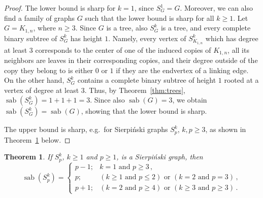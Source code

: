 \documentclass[10pt,a4paper]{amsart}
\newtheorem{theorem}{Theorem}[section]
\DeclareMathOperator{\sab}{\mathrm{sab}}
\begin{document}
\begin{proof}
The lower bound is sharp for $k=1$, since $S_G^1=G$. Moreover, we can also find a family of graphs $G$ such that the lower bound is sharp for all $k \geq 1$. Let $G=K_{1,n}$, where $n\ge 3$. Since $G$ is a tree, also $S^k_G$ is a tree, and every complete binary subtree of $S^k_G$ has height $1$. Namely, every vertex of $S^k_{K_{1,n}}$ which has degree at least $3$ corresponds to the center of one of the induced copies of $K_{1,n}$, all its neighbors are leaves in their corresponding copies, and their degree outside of the copy they belong to is either $0$ or $1$ if they are the endvertex of a linking edge. On the other hand, $S^k_G$ contains a complete binary subtree of height $1$ rooted at a vertex of degree at least $3$.  Thus, by Theorem~\ref{thm:trees}, $\sab(S_G^k)=1+1+1=3$. Since also $\sab(G)=3$, we obtain $\sab(S_G^k)=\sab(G)$, showing that the lower bound is sharp.

The upper bound is sharp, e.g.\ for Sierpi\'nski graphs $S^k_p$, $k,p\ge 3$, as shown in Theorem~\ref{thm:sierpinski} below.
\end{proof}

\begin{theorem}
\label{thm:sierpinski}
If $S^k_p$, $k\ge 1$ and $p\ge 1$, is a Sierpi\'nski graph, then 
$$\sab(S^k_p) =  
\begin{cases}
p-1; & k=1 \mbox{ and } p \ge 3\,,\\[5pt]
p; & (k\ge 1 \mbox{ and } p \le 2) \mbox{ or } (k=2 \mbox{ and } p=3)\,,\\[5pt]
p+1; & (k=2 \mbox{ and } p \ge 4) \mbox{ or } (k\ge 3 \mbox{ and } p\ge 3)\,.
\end{cases}$$ 
\end{theorem}
\end{document}
